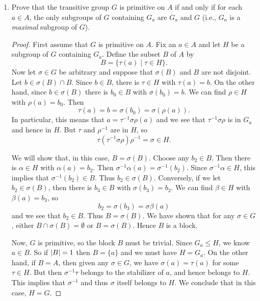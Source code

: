 \begin{enumerate}
\item Prove that the transitive group $G$ is primitive on $A$ if and
  only if for each $a\in A$, the only subgroups of $G$ containing
  $G_a$ are $G_a$ and $G$ (i.e., $G_a$ is a {\em maximal} subgroup of
  $G$).
  \begin{proof}
    First assume that $G$ is primitive on $A$. Fix an $a\in A$ and let
    $H$ be a subgroup of $G$ containing $G_a$. Define the subset $B$
    of $A$ by
    \begin{equation*}
      B = \{\tau(a)\mid \tau\in H\}.
    \end{equation*}
    Now let $\sigma\in G$ be arbitrary and suppose that $\sigma(B)$
    and $B$ are not disjoint. Let $b\in\sigma(B)\cap B$. Since
    $b\in B$, there is $\tau\in H$ with $\tau(a) = b$. On the other
    hand, since $b\in\sigma(B)$ there is $b_0\in B$ with
    $\sigma(b_0) = b$. We can find $\rho\in H$ with $\rho(a) =
    b_0$. Then
    \begin{equation*}
      \tau(a) = b = \sigma(b_0) = \sigma(\rho(a)).
    \end{equation*}
    In particular, this means that $a = \tau^{-1}\sigma\rho(a)$ and we
    see that $\tau^{-1}\sigma\rho$ is in $G_a$ and hence in $H$. But
    $\tau$ and $\rho^{-1}$ are in $H$, so
    \begin{equation*}
      \tau(\tau^{-1}\sigma\rho)\rho^{-1} = \sigma \in H.
    \end{equation*}

    We will show that, in this case, $B = \sigma(B)$. Choose any
    $b_2\in B$. Then there is $\alpha\in H$ with $\alpha(a) =
    b_2$. Then $\sigma^{-1}\alpha(a) = \sigma^{-1}(b_2)$. Since
    $\sigma^{-1}\alpha\in H$, this implies that
    $\sigma^{-1}(b_2)\in B$. Thus $b_2\in\sigma(B)$. Conversely, if we
    let $b_2\in\sigma(B)$, then there is $b_3\in B$ with
    $\sigma(b_3) = b_2$. We can find $\beta\in H$ with
    $\beta(a) = b_3$, so
    \begin{equation*}
      b_2 = \sigma(b_3) = \sigma\beta(a)
    \end{equation*}
    and we see that $b_2\in B$. Thus $B = \sigma(B)$. We have shown
    that for any $\sigma\in G$, either $B\cap\sigma(B) = \emptyset$ or
    $B = \sigma(B)$. Hence $B$ is a block.

    Now, $G$ is primitive, so the block $B$ must be trivial. Since
    $G_a\leq H$, we know $a\in B$. So if $\lvert{B}\rvert = 1$ then
    $B = \{a\}$ and we must have $H = G_a$. On the other hand, if
    $B = A$, then given any $\sigma\in G$, we have
    $\sigma(a) = \tau(a)$ for some $\tau\in H$. But then
    $\sigma^{-1}\tau$ belongs to the stabilizer of $a$, and hence
    belongs to $H$. This implies that $\sigma^{-1}$ and thus $\sigma$
    itself belongs to $H$. We conclude that in this case, $H = G$.


\end{proof}
\end{enumerate}
